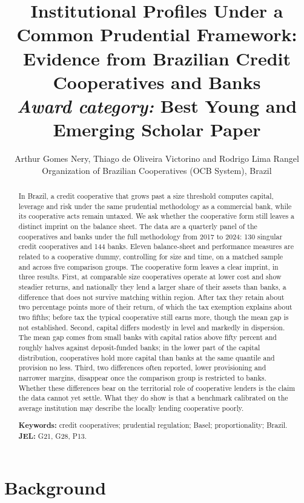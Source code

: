 \documentclass[11pt,a4paper]{article}
\title{\textbf{Institutional Profiles Under a Common Prudential Framework:}\\[0.3em]
\large Evidence from Brazilian Credit Cooperatives and Banks\\[0.8em]
\normalsize\normalfont\textit{Award category:} Best Young and Emerging Scholar Paper}
\author{Arthur Gomes Nery, Thiago de Oliveira Victorino and
Rodrigo Lima Rangel\\[0.6em]
\small Organization of Brazilian Cooperatives (OCB System), Brazil}
\date{}
\begin{document}
\maketitle

\begin{abstract}
\noindent In Brazil, a credit cooperative that grows past a size threshold computes
capital, leverage and risk under the same prudential methodology as a commercial bank,
while its cooperative acts remain untaxed. We ask whether the cooperative form still
leaves a distinct imprint on the balance sheet. The data are a quarterly panel of the
cooperatives and banks under the full methodology from 2017 to 2024: 130 singular credit
cooperatives and 144 banks. Eleven balance-sheet and performance measures are related to a cooperative dummy,
controlling for size and time, on a matched sample and across five comparison groups.
The cooperative form leaves a clear imprint, in three results. First, at comparable
size cooperatives operate at lower cost and show steadier returns, and nationally they
lend a larger share of their assets than banks, a difference that does not survive
matching within region. After tax they retain about two percentage points more of their return, of which the
tax exemption explains about two fifths; before tax the typical cooperative still earns
more, though the mean gap is not established. Second, capital differs modestly in level
and markedly in dispersion. The mean gap comes from small banks with capital ratios
above fifty percent and roughly halves against deposit-funded banks; in the lower part of the capital distribution, cooperatives hold
more capital than banks at the same quantile and provision no less. Third, two differences often reported, lower provisioning and narrower margins,
disappear once the comparison group is restricted to banks. Whether these differences
bear on the territorial role of cooperative lenders is the claim the data cannot yet
settle. What they do show is that a benchmark calibrated on the average institution may
describe the locally lending cooperative poorly.

\medskip
\noindent\textbf{Keywords:} credit cooperatives; prudential regulation; Basel;
proportionality; Brazil.\\
\textbf{JEL:} G21, G28, P13.
\end{abstract}

\newpage

\section{Background}
\end{document}
